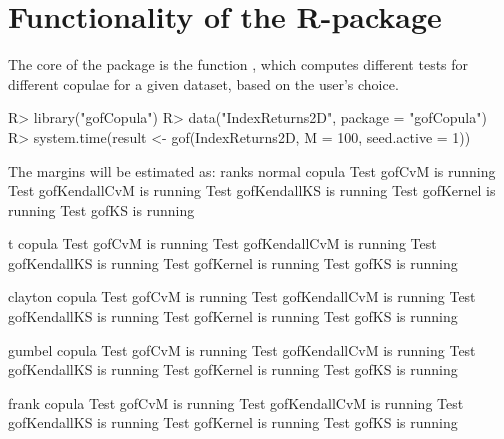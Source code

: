 \section{Functionality of the R-package}
\label{sec:PackageFuncs}
The core of the  package is the function , which computes different tests for different copulae for a given dataset, based on the \mycolor user's choice.\bk

\begin{example}
R> library("gofCopula")
R> data("IndexReturns2D", package = "gofCopula")
R> system.time(result <- gof(IndexReturns2D, M = 100, seed.active = 1))
\end{example}
\mycolor
\begin{example}
The margins will be estimated as: ranks
normal copula
Test gofCvM is running
Test gofKendallCvM is running                                     
Test gofKendallKS is running                                      
Test gofKernel is running                                         
Test gofKS is running                                             
                                                                  
t copula
Test gofCvM is running
Test gofKendallCvM is running                                     
Test gofKendallKS is running                                      
Test gofKernel is running                                         
Test gofKS is running                                             
                                                                  
clayton copula
Test gofCvM is running
Test gofKendallCvM is running                                     
Test gofKendallKS is running                                      
Test gofKernel is running                                         
Test gofKS is running                                             
                                                                  
gumbel copula
Test gofCvM is running
Test gofKendallCvM is running                                     
Test gofKendallKS is running                                      
Test gofKernel is running                                         
Test gofKS is running                                             
                                                                  
frank copula
Test gofCvM is running
Test gofKendallCvM is running                                     
Test gofKendallKS is running                                      
Test gofKernel is running                                         
Test gofKS is running                                             
                                                                  

\end{example}
